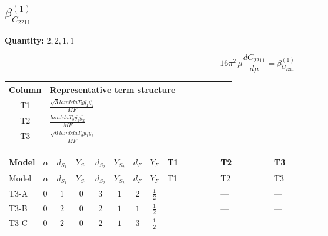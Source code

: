 \documentclass[8pt]{article}
\begin{document}
\begin{landscape}
\section*{$\beta_{C_{2211}}^{(1)}$}
\noindent\textbf{Quantity: }$\mathrm{2,2,1,1}$\par\smallskip
\[16\pi^2\,\mu\frac{d C_{2211}}{d\mu}=\beta_{C_{2211}}^{(1)}\]
\begin{center}
\begin{tabular}{@{}c >{\raggedright\arraybackslash}p{0.82\linewidth}@{}}
\toprule
Column & Representative term structure \\
\midrule
T1 & \(\displaystyle \frac{\sqrt{3} lambdaT_{3} \overline{y_{1}} \overline{y_{2}}}{MF}\) \\
\midrule
T2 & \(\displaystyle \frac{lambdaT_{3} \overline{y_{1}} \overline{y_{2}}}{MF}\) \\
\midrule
T3 & \(\displaystyle \frac{\sqrt{6} lambdaT_{3} \overline{y_{1}} \overline{y_{2}}}{MF}\) \\
\midrule
\bottomrule
\end{tabular}
\end{center}
\smallskip
\tiny
\begin{longtable}{@{}llcccccc >{\raggedright\arraybackslash}p{0.21\linewidth} >{\raggedright\arraybackslash}p{0.21\linewidth} >{\raggedright\arraybackslash}p{0.21\linewidth}@{}}
\toprule
Model & $\alpha$ & $d_{S_1}$ & $Y_{S_1}$ & $d_{S_2}$ & $Y_{S_2}$ & $d_F$ & $Y_F$ & T1 & T2 & T3 \\
\midrule
\endfirsthead
\toprule
Model & $\alpha$ & $d_{S_1}$ & $Y_{S_1}$ & $d_{S_2}$ & $Y_{S_2}$ & $d_F$ & $Y_F$ & T1 & T2 & T3 \\
\midrule
\endhead
T3-A & $0$ & $1$ & $0$ & $3$ & $1$ & $2$ & $\frac{1}{2}$ & \scriptsize\adjustbox{max width=\linewidth}{$\begin{gathered} \frac{2 \sqrt{3} lambdaT_{3} \overline{y_{1}} \overline{y_{2}}}{3 MF}\end{gathered}$} & --- & --- \\
\midrule
T3-B & $0$ & $2$ & $0$ & $2$ & $1$ & $1$ & $\frac{1}{2}$ & \scriptsize\adjustbox{max width=\linewidth}{$\begin{gathered} \frac{2 \sqrt{3} lambdaT_{3} \overline{y_{1}} \overline{y_{2}}}{3 MF}\end{gathered}$} & --- & --- \\
\midrule
T3-C & $0$ & $2$ & $0$ & $2$ & $1$ & $3$ & $\frac{1}{2}$ & --- & \scriptsize\adjustbox{max width=\linewidth}{$\begin{gathered} - \frac{2 lambdaT_{3} \overline{y_{1}} \overline{y_{2}}}{3 MF}\end{gathered}$} & --- \\

\end{longtable}
\end{landscape}
\end{document}
